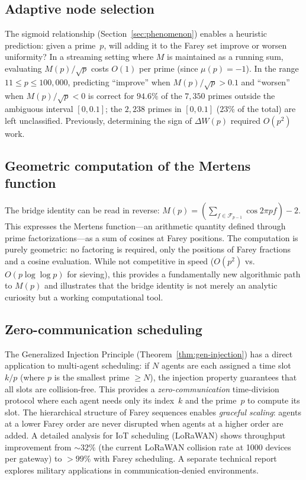 \documentclass[11pt]{article}
\theoremstyle{definition}
\newcommand{\F}{\mathcal{F}}
\begin{document}
\subsection{Adaptive node selection}

The sigmoid relationship (Section~\ref{sec:phenomenon}) enables
a heuristic prediction: given a prime~$p$, will adding it to the
Farey set improve or worsen uniformity?  In a streaming setting
where $M$ is maintained as a running sum, evaluating
$M(p)/\sqrt{p}$ costs $O(1)$ per prime (since $\mu(p) = -1$).
In the range $11 \le p \le 100{,}000$, predicting ``improve''
when $M(p)/\sqrt{p} > 0.1$ and ``worsen'' when
$M(p)/\sqrt{p} < 0$ is correct for $94.6\%$ of the $7{,}350$
primes outside the ambiguous interval $[0, 0.1]$; the $2{,}238$
primes in $[0, 0.1]$ ($23\%$ of the total) are left unclassified.
Previously, determining the sign of $\Delta W(p)$ required
$O(p^2)$ work.

\subsection{Geometric computation of the Mertens function}

The bridge identity can be read in reverse: $M(p) =
(\sum_{f \in \F_{p-1}} \cos 2\pi pf) - 2$.  This expresses
the Mertens function---an arithmetic quantity defined through
prime factorizations---as a sum of cosines at Farey positions.
The computation is purely geometric: no factoring is required,
only the positions of Farey fractions and a cosine evaluation.
While not competitive in speed ($O(p^2)$ vs.\ $O(p\log\log p)$
for sieving), this provides a fundamentally new algorithmic path
to $M(p)$ and illustrates that the bridge identity is not
merely an analytic curiosity but a working computational tool.

\subsection{Zero-communication scheduling}

The Generalized Injection Principle
(Theorem~\ref{thm:gen-injection}) has a direct application
to multi-agent scheduling: if $N$ agents are each assigned
a time slot $k/p$ (where $p$ is the smallest prime $\ge N$),
the injection property guarantees that all slots are
collision-free.  This provides a \emph{zero-communication}
time-division protocol where each agent needs only its
index~$k$ and the prime~$p$ to compute its slot.
The hierarchical structure of Farey sequences enables
\emph{graceful scaling}: agents at a lower Farey order
are never disrupted when agents at a higher order are added.
A detailed analysis for IoT scheduling (LoRaWAN) shows
throughput improvement from ${\sim}32\%$ (the current
LoRaWAN collision rate at 1000 devices per gateway) to
$>99\%$ with Farey scheduling.  A separate technical
report explores military applications in communication-denied
environments.
\end{document}
